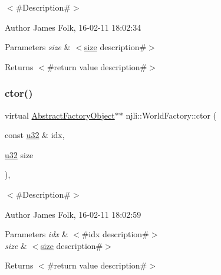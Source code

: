 $<$\#\+Description\#$>$ 

\begin{DoxyAuthor}{Author}
James Folk, 16-\/02-\/11 18\+:02\+:34
\end{DoxyAuthor}

\begin{DoxyParams}{Parameters}
{\em size} & $<$\mbox{\hyperlink{classnjli_1_1_world_factory_ad5d3fc4509c0939fd64f5d8473e915d2}{size}} description\#$>$\\
\hline
\end{DoxyParams}
\begin{DoxyReturn}{Returns}
$<$\#return value description\#$>$ 
\end{DoxyReturn}
\mbox{\label{classnjli_1_1_world_factory_a1bdcf046664e630474e71c6ca48a54c5}} 
\subsubsection{\texorpdfstring{ctor()}{ctor()}\hspace{0.1cm}{\footnotesize\ttfamily [2/4]}}
{\footnotesize\ttfamily virtual \mbox{\hyperlink{classnjli_1_1_abstract_factory_object}{Abstract\+Factory\+Object}}$\ast$$\ast$ njli\+::\+World\+Factory\+::ctor (\begin{DoxyParamCaption}\item[{const \mbox{\hyperlink{_util_8h_a10e94b422ef0c20dcdec20d31a1f5049}{u32}} \&}]{idx,  }\item[{\mbox{\hyperlink{_util_8h_a10e94b422ef0c20dcdec20d31a1f5049}{u32}}}]{size }\end{DoxyParamCaption})\hspace{0.3cm}{\ttfamily [protected]}, {\ttfamily [virtual]}}



$<$\#\+Description\#$>$ 

\begin{DoxyAuthor}{Author}
James Folk, 16-\/02-\/11 18\+:02\+:59
\end{DoxyAuthor}

\begin{DoxyParams}{Parameters}
{\em idx} & $<$\#idx description\#$>$ \\
\hline
{\em size} & $<$\mbox{\hyperlink{classnjli_1_1_world_factory_ad5d3fc4509c0939fd64f5d8473e915d2}{size}} description\#$>$\\
\hline
\end{DoxyParams}
\begin{DoxyReturn}{Returns}
$<$\#return value description\#$>$ 
\end{DoxyReturn}
\mbox{\label{classnjli_1_1_world_factory_a5646bfc3148c2e87ecf1bab41a933674}} 
